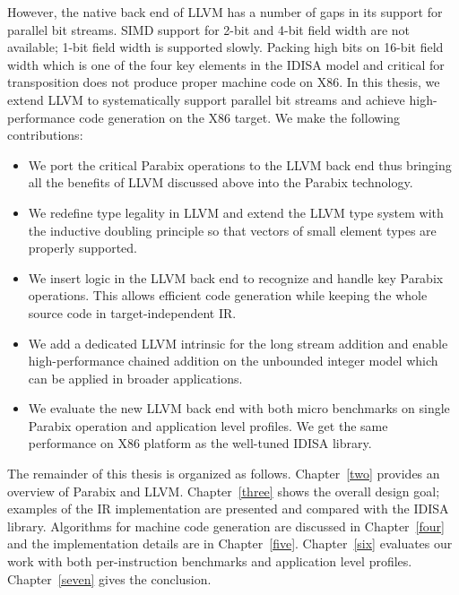 However, the native back end of LLVM has a number of gaps in its support for parallel bit streams. SIMD support for 2-bit and 4-bit field width are not available; 1-bit field width is supported slowly. Packing high bits on 16-bit field width which is one of the four key elements in the IDISA model and critical for transposition does not produce proper machine code on X86. In this thesis, we extend LLVM to systematically support parallel bit streams and achieve high-performance code generation on the X86 target. We make the following contributions:

\begin{itemize}
  \item We port the critical Parabix operations to the LLVM back end thus bringing all the benefits of LLVM discussed above into the Parabix technology.
  \item We redefine type legality in LLVM and extend the LLVM type system with the inductive doubling principle so that vectors of small element types are properly supported.
  \item We insert logic in the LLVM back end to recognize and handle key Parabix operations. This allows efficient code generation while keeping the whole source code in target-independent IR\@.
  \item We add a dedicated LLVM intrinsic for the long stream addition and enable high-performance chained addition on the unbounded integer model which can be applied in broader applications.
  \item We evaluate the new LLVM back end with both micro benchmarks on single Parabix operation and application level profiles. We get the same performance on X86 platform as the well-tuned IDISA library.
\end{itemize}

The remainder of this thesis is organized as follows. Chapter~\ref{two} provides an overview of Parabix and LLVM\@. Chapter~\ref{three} shows the overall design goal; examples of the IR implementation are presented and compared with the IDISA library. Algorithms for machine code generation are discussed in Chapter~\ref{four} and the implementation details are in Chapter~\ref{five}. Chapter~\ref{six} evaluates our work with both per-instruction benchmarks and application level profiles. Chapter~\ref{seven} gives the conclusion.

